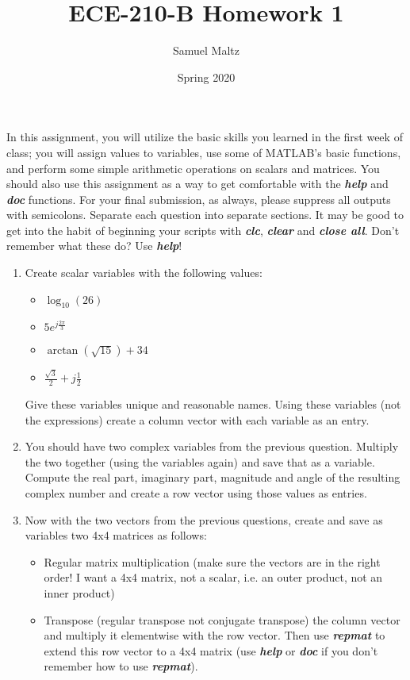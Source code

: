 \documentclass[11pt]{article}
\title{ECE-210-B Homework 1}
\author{Samuel Maltz}
\date{Spring 2020}
\begin{document}
\noindent In this assignment, you will utilize the basic skills you learned in the first week of class; you will assign values to variables, use some of MATLAB’s basic functions, and perform some simple arithmetic operations on scalars and matrices. You should also use this assignment as a way to get comfortable with the \textit{\textbf{help}} and \textit{\textbf{doc}} functions. For your final submission, as always, please suppress all outputs with semicolons. Separate each question into separate sections. It may be good to get into the habit of beginning your scripts with \textit{\textbf{clc}}, \textit{\textbf{clear}} and \textit{\textbf{close all}}. Don’t remember what these do? Use \textit{\textbf{help}}!

\begin{enumerate}
\item Create scalar variables with the following values:
	\begin{itemize}
		\item $\log_{10}(26)$
		\item $5e^{j\frac{2\pi}{3}}$
		\item $\arctan(\sqrt{15}) + 34$
		\item $\frac{\sqrt{3}}{2} + j\frac{1}{2}$
	\end{itemize}
Give these variables unique and reasonable names. Using these variables (not the expressions) create a column vector with each variable as an entry.
\item You should have two complex variables from the previous question. Multiply the two together (using the variables again) and save that as a variable. Compute  the real part, imaginary part, magnitude and angle of the resulting complex number and create a row vector using those values as entries.
\item Now with the two vectors from the previous questions, create and save as variables two 4x4 matrices as follows:
	\begin{itemize}
		\item Regular matrix multiplication (make sure the vectors are in the right order! I want a 4x4 matrix, not a scalar, i.e. an outer product, not an inner product)
		\item Transpose (regular transpose not conjugate transpose) the column vector and multiply it elementwise with the row vector. Then use \textit{\textbf{repmat}} to extend this row vector to a 4x4 matrix (use \textit{\textbf{help}} or \textit{\textbf{doc}} if you don't remember how to use \textit{\textbf{repmat}}).
	\end{itemize}

\end{enumerate}
\end{document}
